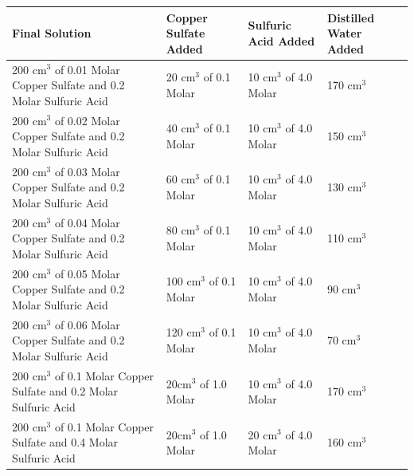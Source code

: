 \begin{center}
\begin{tabular}{|p{5cm}|p{2cm}|p{2cm}|p{2cm}|}
    \hline
    \textbf{Final Solution} & \textbf{Copper Sulfate Added} & \textbf{Sulfuric Acid Added} & \textbf{Distilled Water Added} \\ \hline

200 cm$^3$ of 0.01 Molar Copper Sulfate and 0.2 Molar Sulfuric Acid                &    20 cm$^3$ of 0.1 Molar                &     10 cm$^3$ of 4.0 Molar              & 170 cm$^3$                          \\ \hline

200 cm$^3$ of 0.02 Molar Copper Sulfate and 0.2 Molar Sulfuric Acid                &    40 cm$^3$ of 0.1 Molar                &     10 cm$^3$ of 4.0 Molar              & 150 cm$^3$                          \\ \hline

200 cm$^3$ of 0.03 Molar Copper Sulfate and 0.2 Molar Sulfuric Acid                &    60 cm$^3$ of 0.1 Molar                &     10 cm$^3$ of 4.0 Molar              & 130 cm$^3$                          \\ \hline

200 cm$^3$ of 0.04 Molar Copper Sulfate and 0.2 Molar Sulfuric Acid                &    80 cm$^3$ of 0.1 Molar                &     10 cm$^3$ of 4.0 Molar              & 110 cm$^3$                          \\ \hline

200 cm$^3$ of 0.05 Molar Copper Sulfate and 0.2 Molar Sulfuric Acid                &    100 cm$^3$ of 0.1 Molar                &     10 cm$^3$ of 4.0 Molar              & 90 cm$^3$                          \\ \hline

200 cm$^3$ of 0.06 Molar Copper Sulfate and 0.2 Molar Sulfuric Acid                &    120 cm$^3$ of 0.1 Molar                &     10 cm$^3$ of 4.0 Molar              & 70 cm$^3$                          \\ \hline



200 cm$^3$ of 0.1 Molar Copper Sulfate and 0.2 Molar Sulfuric Acid &  20cm$^3$ of 1.0 Molar & 10 cm$^3$ of 4.0 Molar & 170 cm$^3$ \\ \hline

200 cm$^3$ of 0.1 Molar Copper Sulfate and 0.4 Molar Sulfuric Acid &  20cm$^3$  of 1.0 Molar & 20 cm$^3$ of 4.0 Molar & 160 cm$^3$ \\ \hline


\end{tabular}
\end{center}
